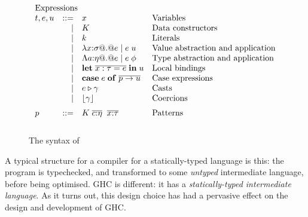 \documentclass{article}
\begin{document}
\newcommand{\clift}[1]{\lfloor#1\rfloor}
\newcommand{\ol}[1]{\overline{#1}}
\newcommand{\tcase}[2]{\mathbf{case}\;#1\;\mathbf{of}\;\ol{#2}}
\newcommand{\tlet}[4]{\mathbf{let}\;#1{:}#2 = #3\;\mathbf{in}\;#4}
\newcommand{\tcast}[2]{#1\xspace\triangleright\xspace#2}
\begin{figure}
$$
\begin{array}{lrll}
\multicolumn{3}{l}{\text{Expressions}} \\
t,e,u & ::= & x  & \text{Variables} \\
      & \mid & K & \text{Data constructors} \\ 
      & \mid & k & \text{Literals} \\
      & \mid & \lambda x{:}\sigma @.@ e \mid e\;u 
             & \text{Value abstraction and application} \\ 
    & \mid   &  \Lambda a{:}\eta @.@ e \mid e\;\phi
             & \text{Type abstraction and application} \\ 
    & \mid    & \mathbf{let}\;\ol{x:\tau = e}\;\mathbf{in}\;u 
             & \text{Local bindings} \\ 
    & \mid    & \tcase{e}{p \to u} 
             & \text{Case expressions} \\ 
    & \mid    & \tcast{e}{\gamma}         &  \text{Casts} \\
    & \mid    & \clift{\gamma}            &  \text{Coercions} \\[2mm] 
 p  & ::=     & K\; \ol{c{:}\eta}\;\;\ol{x{:}\tau} & \text{Patterns} \\[3mm]
\end{array} 
$$
\label{fig:core-syntax}
\caption{The syntax of \Core{}}
\end{figure}

A typical structure for a compiler for a statically-typed language is
this: the program is typechecked, and transformed to some
\emph{untyped} intermediate language, before being optimised.
GHC is different: it has a \emph{statically-typed intermediate language}.
As it turns out, this design choice has had a pervasive effect on the design and development of GHC.
\end{document}
